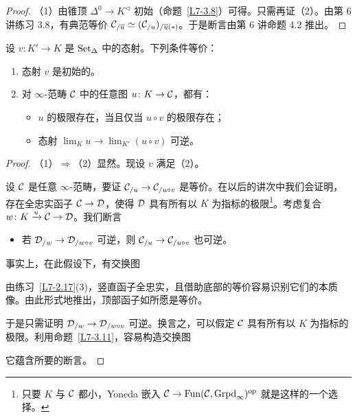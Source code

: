 \begin{proof}
（1）由锥顶 $\Delta^0\to K^{\lhd}$ 初始（命题~\ref{L7-3.8}）可得。只需再证（2）。由第 6 讲练习 3.8，有典范等价 $\mathcal{C}_{/\overline u}\simeq(\mathcal{C}_{/u})_{/\overline u(*)}$。于是断言由第 6 讲命题 4.2 推出。
\end{proof}

\begin{proposition}\label{L7-3.12}
设 $v\colon K'\to K$ 是 $\operatorname{Set}_\Delta$ 中的态射。下列条件等价：
\begin{enumerate}[label=(\arabic*),leftmargin=2.4em,itemsep=0.1em]
\item 态射 $v$ 是初始的。
\item 对 $\infty$-范畴 $\mathcal{C}$ 中的任意图 $u\colon K\to\mathcal{C}$，都有：
\begin{itemize}[leftmargin=2.2em,itemsep=0.1em]
\item $u$ 的极限存在，当且仅当 $u\circ v$ 的极限存在；
\item 态射 $\lim_K u\to\lim_{K'}(u\circ v)$ 可逆。
\end{itemize}
\end{enumerate}
\end{proposition}

\begin{proof}
（1）$\Rightarrow$（2）显然。现设 $v$ 满足（2）。

设 $\mathcal{C}$ 是任意 $\infty$-范畴，要证 $\mathcal{C}_{/u}\to\mathcal{C}_{/u\circ v}$ 是等价。在以后的讲次中我们会证明，存在全忠实函子 $\mathcal{C}\to\mathcal{D}$，使得 $\mathcal{D}$ 具有所有以 $K$ 为指标的极限\footnote{只要 $K$ 与 $\mathcal{C}$ 都小，Yoneda 嵌入 $\mathcal{C}\to\operatorname{Fun}(\mathcal{C},\operatorname{Grpd}_\infty)^{\mathrm{op}}$ 就是这样的一个选择。}。考虑复合 $w\colon K\xrightarrow{u}\mathcal{C}\to\mathcal{D}$。我们断言
\begin{itemize}[leftmargin=2.2em,itemsep=0.1em]
\item 若 $\mathcal{D}_{/w}\to\mathcal{D}_{/w\circ v}$ 可逆，则 $\mathcal{C}_{/u}\to\mathcal{C}_{/u\circ v}$ 也可逆。
\end{itemize}
事实上，在此假设下，有交换图
\begin{center}
\end{center}
由练习~\ref{L7-2.17}(3)，竖直函子全忠实，且借助底部的等价容易识别它们的本质像。由此形式地推出，顶部函子如所愿是等价。

于是只需证明 $\mathcal{D}_{/w}\to\mathcal{D}_{/w\circ v}$ 可逆。换言之，可以假定 $\mathcal{C}$ 具有所有以 $K$ 为指标的极限。利用命题~\ref{L7-3.11}，容易构造交换图
\begin{center}
\end{center}
它蕴含所要的断言。
\end{proof}

